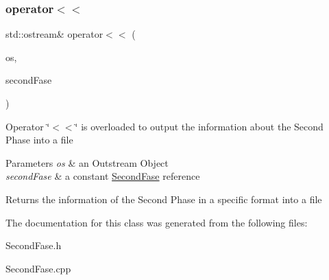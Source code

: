 \subsubsection{\texorpdfstring{operator$<$$<$}{operator<<}}
{\footnotesize\ttfamily std\+::ostream\& operator$<$$<$ (\begin{DoxyParamCaption}\item[{std\+::ostream \&}]{os,  }\item[{const \hyperlink{class_second_fase}{Second\+Fase} \&}]{second\+Fase }\end{DoxyParamCaption})\hspace{0.3cm}{\ttfamily [friend]}}

Operator \char`\"{}$<$$<$\char`\"{} is overloaded to output the information about the Second Phase into a file 
\begin{DoxyParams}{Parameters}
{\em os} & an Outstream Object \\
\hline
{\em second\+Fase} & a constant \hyperlink{class_second_fase}{Second\+Fase} reference \\
\hline
\end{DoxyParams}
\begin{DoxyReturn}{Returns}
the information of the Second Phase in a specific format into a file 
\end{DoxyReturn}


The documentation for this class was generated from the following files\+:\begin{DoxyCompactItemize}
\item 
Second\+Fase.\+h\item 
Second\+Fase.\+cpp\end{DoxyCompactItemize}
